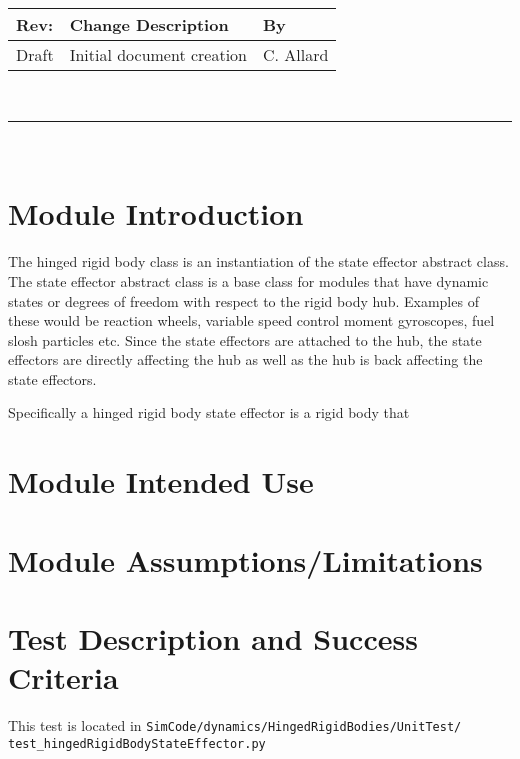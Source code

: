 \documentclass[]{BasiliskReportMemo}
\begin{document}
\makeCover
%
%
\pagestyle{empty}
{\renewcommand{\arraystretch}{1.1}
\noindent
\begin{longtable}{|p{0.5in}|p{4.5in}|p{1.14in}|}
\hline
{\bfseries Rev}: & {\bfseries Change Description} & {\bfseries By} \\
\hline
Draft & Initial document creation & C. Allard \\
\hline

\end{longtable}
}

\newpage
\setcounter{page}{1}
\pagestyle{fancy}

\tableofcontents
~\\ \hrule ~\\



\section{Module Introduction}
The hinged rigid body class is an instantiation of the state effector abstract class. The state effector abstract class is a base class for modules that have dynamic states or degrees of freedom with respect to the rigid body hub. Examples of these would be reaction wheels, variable speed control moment gyroscopes, fuel slosh particles etc. Since the state effectors are attached to the hub, the state effectors are directly affecting the hub as well as the hub is back affecting the state effectors.

Specifically a hinged rigid body state effector is a rigid body that 

\section{Module Intended Use}

\section{Module Assumptions/Limitations}

\section{Test Description and Success Criteria}

This test is located in \tt SimCode/dynamics/HingedRigidBodies/UnitTest/\newline
test\_hingedRigidBodyStateEffector.py 
\end{document}
